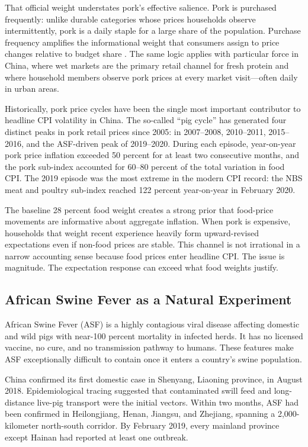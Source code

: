 That official weight understates pork's effective salience.
Pork is purchased frequently: unlike durable categories whose
prices households observe intermittently, pork is a daily
staple for a large share of the population.
Purchase frequency amplifies the informational weight that
consumers assign to price changes relative to budget share
\citep{Cavallo2017}.
The same logic applies with particular force in China, where
wet markets are the primary retail channel for fresh protein
and where household members observe pork prices at every
market visit---often daily in urban areas.

Historically, pork price cycles have been the single most
important contributor to headline CPI volatility in China.
The so-called ``pig cycle'' has generated four distinct peaks
in pork retail prices since 2005: in 2007--2008, 2010--2011,
2015--2016, and the ASF-driven peak of 2019--2020.
During each episode, year-on-year pork price inflation exceeded
50 percent for at least two consecutive months, and the pork
sub-index accounted for 60--80 percent of the total variation
in food CPI.
The 2019 episode was the most extreme in the modern CPI
record: the NBS meat and poultry sub-index reached 122
percent year-on-year in February 2020.

The baseline 28 percent food weight creates a strong prior
that food-price movements are informative about aggregate
inflation.
When pork is expensive, households that weight recent
experience heavily form upward-revised expectations even if
non-food prices are stable.
This channel is not irrational in a narrow accounting sense
because food prices enter headline CPI.
The issue is magnitude.
The expectation response can exceed what food weights justify.

\subsection{African Swine Fever as a Natural Experiment}%
\label{sec:asf}

African Swine Fever (ASF) is a highly contagious viral disease
affecting domestic and wild pigs with near-100 percent mortality
in infected herds.
It has no licensed vaccine, no cure, and no transmission pathway
to humans.
These features make ASF exceptionally difficult to contain
once it enters a country's swine population.

China confirmed its first domestic case in Shenyang, Liaoning
province, in August 2018.
Epidemiological tracing suggested that contaminated swill feed
and long-distance live-pig transport were the initial vectors.
Within two months, ASF had been confirmed in Heilongjiang,
Henan, Jiangsu, and Zhejiang, spanning a 2,000-kilometer
north-south corridor.
By February 2019, every mainland province except Hainan had
reported at least one outbreak.

